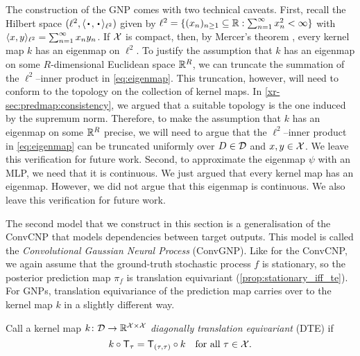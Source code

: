 \documentclass[12pt]{report}
\newcommand{\xrprefix}[1]{xr-#1}
\begin{document}
The construction of the GNP comes with two technical caveats.
First, 
recall the Hilbert space $(\ell^2, \lra{\vardot, \vardot}_{\ell^2})$ given by
$\ell^2 = \{(x_n)_{n \ge 1} \subseteq \mathbb{R} : \sum_{n=1}^\infty x_n^2 < \infty\}$
with
$\langle x, y\rangle_{\ell^2} = \sum_{n =1}^\infty x_n y_n$.
If $\mathcal{X}$ is compact, 
then, by Mercer's theorem \parencite[Theorem 3.3.1;][]{Adler:1981:The_Geometry_of_Random_Fields},
every kernel map $k$ has an eigenmap on $\ell^2$.
To justify the assumption that $k$ has an eigenmap on some $R$-dimensional Euclidean space $\mathbb{R}^R$, we can truncate the summation of the $\ell^2$--inner product in \eqref{eq:eigenmap}.
This truncation, however, will need to conform to the topology on the collection of kernel maps. 
In \cref{\xrprefix{sec:predmap:consistency}}, we argued that a suitable topology is the one induced by the supremum norm.
Therefore, to make the assumption that $k$ has an eigenmap on some $\mathbb{R}^R$ precise, we will need to argue that the $\ell^2$--inner product in \eqref{eq:eigenmap} can be truncated uniformly over $D \in \mathcal{D}$ and $x, y \in \mathcal{X}$.
We leave this verification for future work.
Second, to approximate the eigenmap $\psi$ with an MLP, we need that it is continuous.
We just argued that every kernel map has an eigenmap.
However, we did not argue that this eigenmap is continuous.
We also leave this verification for future work.

The second model that we construct in this section
is a generalisation of the ConvCNP that models dependencies between target outputs.
This model is called the \emph{Convolutional Gaussian Neural Process} (ConvGNP).
Like for the ConvCNP, we again assume that the ground-truth stochastic process $f$ is stationary, so the posterior prediction map $\pi_f$ is translation equivariant (\cref{prop:stationary_iff_te}).
For GNPs, translation equivariance of the prediction map carries over to the kernel map $k$ in a slightly different way.

\begin{definition}
    \label{def:diagonal_translation_equivariance_kernel_map}
    Call a kernel map $k \colon \mathcal{D} \to \mathbb{R}^{\mathcal{X} \times \mathcal{X}}$ \emph{diagonally translation equivariant} (DTE) if
    \begin{equation}
        k \comp \T_\tau = \T_{(\tau, \tau)} \comp k
        \quad \text{for all $\tau \in \X$.}
    \end{equation}
\end{definition}
\end{document}
